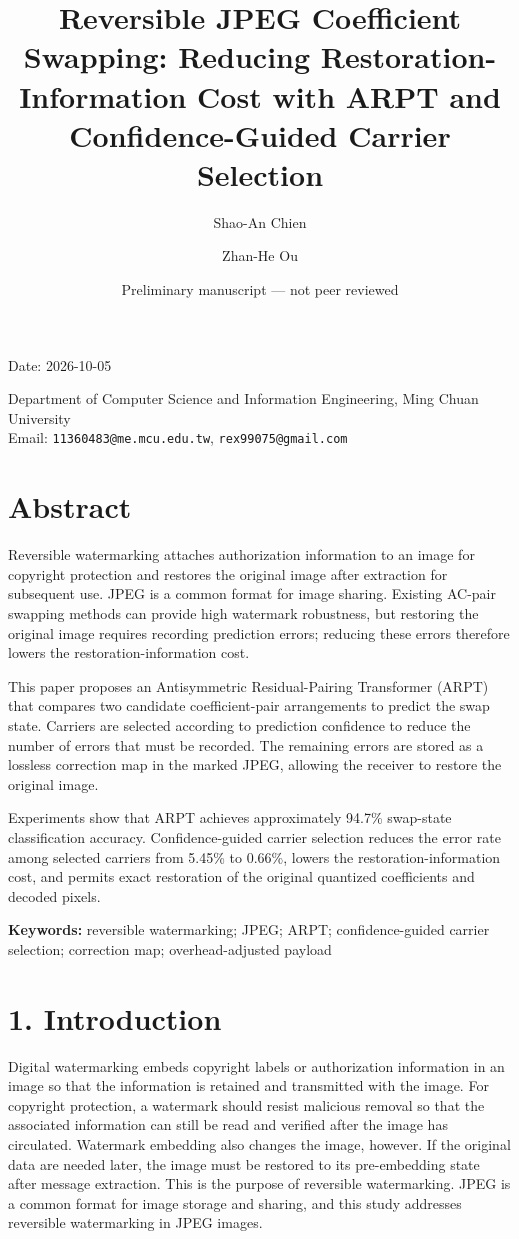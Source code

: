 \documentclass[
  11pt,
  a4paper,
]{article}
\title{Reversible JPEG Coefficient Swapping: Reducing
Restoration-Information Cost with ARPT and Confidence-Guided Carrier
Selection}
\author{Shao-An Chien \and Zhan-He Ou}
\date{Preliminary manuscript --- not peer reviewed}
\begin{document}
\maketitle

Date: 2026-10-05

Department of Computer Science and Information Engineering, Ming Chuan
University\\
Email: \texttt{11360483@me.mcu.edu.tw}, \texttt{rex99075@gmail.com}

\section*{Abstract}\label{abstract}

Reversible watermarking attaches authorization information to an image
for copyright protection and restores the original image after
extraction for subsequent use. JPEG is a common format for image
sharing. Existing AC-pair swapping methods can provide high watermark
robustness, but restoring the original image requires recording
prediction errors; reducing these errors therefore lowers the
restoration-information cost.

This paper proposes an Antisymmetric Residual-Pairing Transformer (ARPT)
that compares two candidate coefficient-pair arrangements to predict the
swap state. Carriers are selected according to prediction confidence to
reduce the number of errors that must be recorded. The remaining errors
are stored as a lossless correction map in the marked JPEG, allowing the
receiver to restore the original image.

Experiments show that ARPT achieves approximately 94.7\% swap-state
classification accuracy. Confidence-guided carrier selection reduces the
error rate among selected carriers from 5.45\% to 0.66\%, lowers the
restoration-information cost, and permits exact restoration of the
original quantized coefficients and decoded pixels.

\textbf{Keywords:} reversible watermarking; JPEG; ARPT;
confidence-guided carrier selection; correction map; overhead-adjusted
payload

\section*{1. Introduction}\label{introduction}

Digital watermarking embeds copyright labels or authorization
information in an image so that the information is retained and
transmitted with the image. For copyright protection, a watermark should
resist malicious removal so that the associated information can still be
read and verified after the image has circulated. Watermark embedding
also changes the image, however. If the original data are needed later,
the image must be restored to its pre-embedding state after message
extraction. This is the purpose of reversible watermarking. JPEG is a
common format for image storage and sharing, and this study addresses
reversible watermarking in JPEG images.
\end{document}
